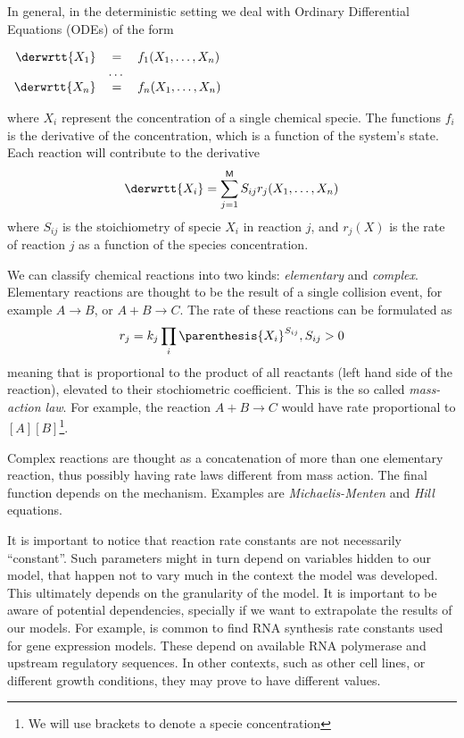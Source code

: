 \documentclass[letterpaper]{article}
\begin{document}
In general, in the deterministic setting we deal with Ordinary
Differential Equations (ODEs) of the form
\begin{center}
  $\begin{array}{rcl} 
    \derwrtt{X_1} & = & f_1(X_1,\dots,X_n) \\
    & \dots & \\
    \derwrtt{X_n} & = & f_n(X_1,\dots,X_n) \\
    \end{array}$
\end{center}
where $X_i$ represent the concentration of a single chemical
specie. The functions $f_i$ is the derivative of the concentration, which
is a function of the system's state. Each reaction will contribute to the
derivative 
$$\derwrtt{X_i} = \sum_{j=1}^{\mathsf{M}}S_{ij} r_j(X_1,\dots,X_n) $$
where $S_{ij}$ is the stoichiometry of specie $X_i$ in reaction $j$,
and $r_j(X)$ is the rate of reaction $j$ as a function of the species
concentration.

We can classify chemical reactions into two kinds: \emph{elementary}
and \emph{complex}. Elementary reactions are thought to be the result of a single
collision event, for example $A \to B$, or $A + B \to C$. The rate
of these reactions can be formulated as
$$r_j = k_j\prod_{i}\parenthesis{X_i}^{S_{ij}}, S_{ij} > 0$$
meaning that is proportional to the product of all reactants (left
hand side of the reaction), elevated to their stochiometric
coefficient. This is the so called \emph{mass-action law}. For
example, the reaction $A + B \to C$ would have rate proportional to
$[A][B]$\footnote{We will use brackets to denote a specie
  concentration}.

Complex reactions are thought as a concatenation of more than one
elementary reaction, thus possibly having rate laws different from
mass action. The final function depends on the mechanism. Examples are
\emph{Michaelis-Menten} and \emph{Hill} equations.

It is important to notice that reaction rate constants are not
necessarily ``constant''.  Such parameters might in turn depend on
variables hidden to our model, that happen not to vary much in the
context the model was developed.  This ultimately depends on the
granularity of the model.  It is important to be aware of potential
dependencies, specially if we want to extrapolate the results of our
models.  For example, is common to find RNA synthesis rate constants
used for gene expression models. These depend on available RNA
polymerase and upstream regulatory sequences. In other contexts, such
as other cell lines, or different growth conditions, they may prove to
have different values.
\end{document}
